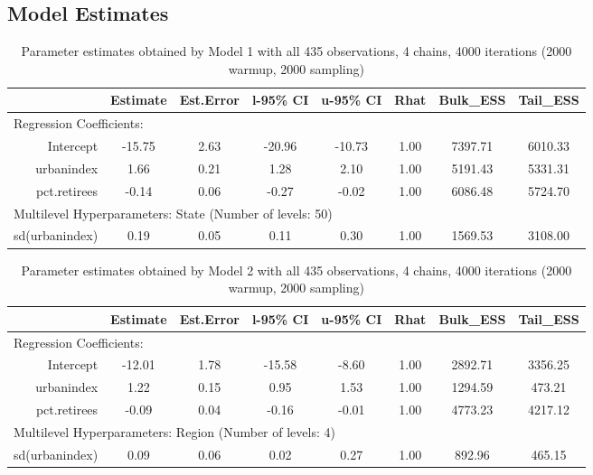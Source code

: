 \documentclass[12pt]{article}
\begin{document}
\clearpage
\FloatBarrier
\subsection*{Model Estimates}

\begin{table}[h!]
	\centering
	\caption{Parameter estimates obtained by Model 1 with all 435 observations, 4 chains, 4000 iterations (2000 warmup, 2000 sampling)}
	\label{tab:model1}
	 \begin{adjustbox}{max width=\textwidth}
	\begin{tabular}{rccccccc}
		\hline
		& Estimate & Est.Error & l-95\% CI & u-95\% CI & Rhat & Bulk\_ESS & Tail\_ESS \\ 
		\hline
		\multicolumn{8}{l}{Regression Coefficients:} \\
		Intercept & -15.75 & 2.63 & -20.96 & -10.73 & 1.00 & 7397.71 & 6010.33 \\ 
		urbanindex & 1.66 & 0.21 & 1.28 & 2.10 & 1.00 & 5191.43 & 5331.31 \\ 
		pct.retirees & -0.14 & 0.06 & -0.27 & -0.02 & 1.00 & 6086.48 & 5724.70 \\
		\midrule
		\multicolumn{8}{l}{Multilevel Hyperparameters: State (Number of levels: 50)}                       \\ 
		sd(urbanindex) & 0.19 & 0.05 & 0.11 & 0.30 & 1.00 & 1569.53 & 3108.00 \\ 
		\hline
	\end{tabular}
		\end{adjustbox}
\end{table}


\begin{table}[h!]
	\centering
	\caption{Parameter estimates obtained by Model 2 with all 435 observations, 4 chains, 4000 iterations (2000 warmup, 2000 sampling)}
	\label{tab:model2}
		 \begin{adjustbox}{max width=\textwidth}
	\begin{tabular}{rccccccc}
		\hline
		               & Estimate & Est.Error & l-95\% CI & u-95\% CI & Rhat & Bulk\_ESS & Tail\_ESS \\
		               \hline
 \multicolumn{8}{l}{Regression Coefficients:} \\
		     Intercept &   -12.01 &      1.78 &    -15.58 &     -8.60 & 1.00 &   2892.71 &   3356.25 \\
		    urbanindex &     1.22 &      0.15 &      0.95 &      1.53 & 1.00 &   1294.59 &    473.21 \\
		  pct.retirees &    -0.09 &      0.04 &     -0.16 &     -0.01 & 1.00 &   4773.23 &   4217.12 \\
		  \midrule
		  \multicolumn{8}{l}{Multilevel Hyperparameters: Region (Number of levels: 4)}                       \\
		sd(urbanindex) &     0.09 &      0.06 &      0.02 &      0.27 & 1.00 &    892.96 &    465.15 \\ \hline
	\end{tabular}
	\end{adjustbox}
	
\end{table}
\end{document}
